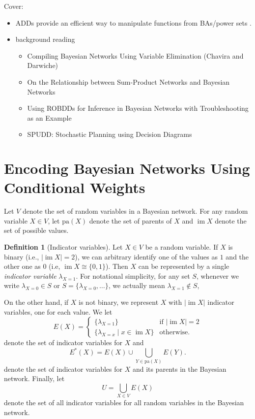 \documentclass{article}
\theoremstyle{definition}
\newtheorem{definition}{Definition}
\theoremstyle{remark}
\DeclareMathOperator{\im}{im}
\begin{document}
Cover:
\begin{itemize}
\item ADDs provide an efficient way to manipulate functions from BAs/power sets
  \cite{DBLP:journals/fmsd/BaharFGHMPS97}.
\item background reading
  \begin{itemize}
  \item Compiling Bayesian Networks Using Variable Elimination (Chavira and
    Darwiche) \cite{DBLP:conf/ijcai/ChaviraD07}
  \item On the Relationship between Sum-Product Networks and Bayesian Networks
    \cite{DBLP:conf/icml/ZhaoMP15}
  \item Using ROBDDs for Inference in Bayesian Networks with Troubleshooting as
    an Example \cite{DBLP:conf/uai/NielsenWJK00}
  \item SPUDD: Stochastic Planning using Decision Diagrams
    \cite{DBLP:conf/uai/HoeySHB99}
  \end{itemize}
\end{itemize}

\section{Encoding Bayesian Networks Using Conditional Weights}

Let $V$ denote the set of random variables in a Bayesian network. For any random
variable $X \in V$, let $\mathrm{pa}(X)$ denote the set of parents of $X$ and
$\im X$ denote the set of possible values.

\begin{definition}[Indicator variables]
  Let $X \in V$ be a random variable. If $X$ is binary (i.e., $|\im X| = 2$), we
  can arbitrary identify one of the values as $1$ and the other one as $0$ (i.e,
  $\im X \cong \{ 0, 1 \}$). Then $X$ can be represented by a single
  \emph{indicator variable} $\lambda_{X=1}$. For notational simplicity, for any
  set $S$, whenever we write $\lambda_{X=0} \in S$ or $S = \{ \lambda_{X=0},
  \dots \}$, we actually mean $\lambda_{X=1} \not\in S$,

  On the other hand, if $X$ is not binary, we represent $X$ with $|\im X|$
  indicator variables, one for each value. We let
  \[
    E(X) = \begin{cases}
      \{ \lambda_{X=1} \} & \text{if } |\im X| = 2 \\
      \{ \lambda_{X=x} \mid x \in \im X \} & \text{otherwise.}
    \end{cases}
  \]
  denote the set of indicator variables for $X$ and
  \[
    E^*(X) = E(X) \cup \bigcup_{Y \in \mathrm{pa}(X)} E(Y).
  \]
  denote the set of indicator variables for $X$ and its parents in the Bayesian
  network. Finally, let
  \[
    U = \bigcup_{X \in V} E(X)
  \]
  denote the set of all indicator variables for all random variables in the
  Bayesian network.
\end{definition}
\end{document}
